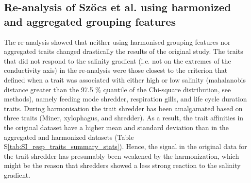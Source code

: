 \documentclass{article}
\begin{document}



\subsection*{Re-analysis of Szöcs et al. using harmonized and aggregated grouping features}

The re-analysis showed that neither using harmonised grouping features nor aggregated traits changed drastically the results of the original study. The traits that did not respond to the salinity gradient (i.e. not on the extremes of the conductivity axis) in the re-analysis were those closest to the criterion that defined when a trait was associated with either high or low salinity (mahalanobis distance greater than the 97.5 \% quantile of the Chi-square distribution, see methods), namely feeding mode shredder, respiration gills, and life cycle duration traits. During harmonisation the trait shredder has been amalgamated based on three traits (Miner, xylophagus, and shredder). As a result, the trait affinities in the original dataset have a higher mean and standard deviation than in the aggregated and harmonized datasets (Table S\ref{tab:SI_resp_traits_summary_stats}). Hence, the signal in the original data for the trait shredder has presumably been weakened by the harmonization, which might be the reason that shredders showed a less strong reaction to the salinity gradient. 
\end{document}

